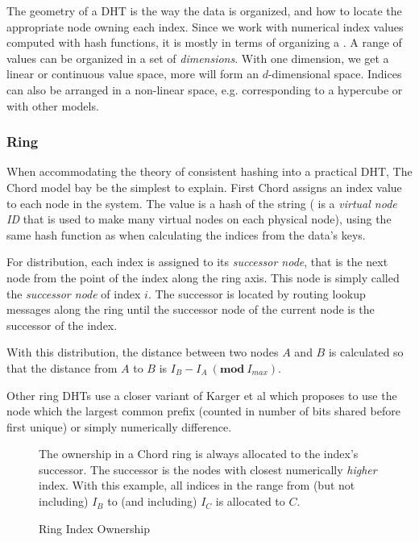 The geometry of a DHT is the way the data is organized, and how to locate the
 appropriate node owning each index. Since we work with numerical index values
 computed with hash functions,
 it is mostly in terms of organizing a . A range of values can be
 organized in a set of \emph{dimensions}. With one dimension, we get a linear or
 continuous value space, more will form an $d$-dimensional
 space\cite{balakrishnan-03-looking,ratnasamy-01-CAN}. Indices can also be arranged in a non-linear space, e.g. corresponding to a hypercube or with other models.

\subsubsection{Ring}
\label{theory:Geometry:Ring}

When accommodating the theory of consistent hashing into a practical DHT, The
 Chord\cite{chord-homepage,stoica-01-chord} model bay be the simplest to explain.
 First Chord assigns
 an index value to each node in the system. The value is a hash of the
  string ( is a \emph{virtual node ID} that
 is used to make many virtual nodes on each physical node), using the same
 hash function as when calculating the indices from the data's keys.

For distribution, each index is assigned to its \emph{successor node}, that is the
 next node from the point of the index along the ring axis. This node is simply
 called the \emph{successor node} of index $i$. The successor is located by routing
 lookup messages along the ring until the successor node of the current node is the
 successor of the index.

With this distribution, the distance between two nodes $A$ and $B$ is calculated so
 that the distance from $A$ to $B$ is
 $I_B - I_A\ (\mathbf{mod\ }I_{max})$.

Other ring DHTs use a closer variant of Karger et al\cite{karger-97-consistent-hashing}
 which proposes to use the node which the largest common prefix (counted in number of
 bits shared before first unique) or simply numerically difference.

\begin{wrapfigure}{r}{.45\linewidth}
\parbox{\linewidth}{\small
   The ownership in a Chord ring is always allocated to the index's successor. The
   successor is the nodes with closest numerically \emph{higher} index. With this
   example, all indices in the range from (but not including) $I_B$ to (and including)
   $I_C$ is allocated to $C$.
}
\caption{Ring Index Ownership}
\label{fig:Ring-Ownership}
\end{wrapfigure}

